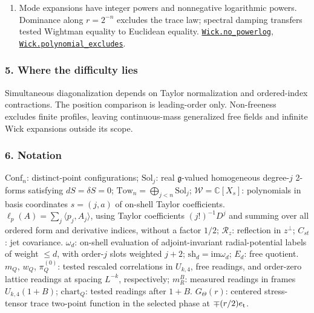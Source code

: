 \documentclass[
  letterpaper,
  11pt]{article}
\begin{document}
\begin{enumerate}
  \href{https://github.com/yang-mills-group/OpenAI-YM-20261028/blob/3456e5e75cf8d4cd558955a5c7638fba2d68f464/YM/Pert/Lattice/Blank.lean\#L41}{\texttt{Full.column}}.
\item
  Mode expansions have integer powers and nonnegative logarithmic
  powers. Dominance along \(r=2^{-n}\) excludes the trace law; spectral
  damping transfers tested Wightman equality to Euclidean equality.
  \href{https://github.com/yang-mills-group/OpenAI-YM-20261028/blob/3456e5e75cf8d4cd558955a5c7638fba2d68f464/YM/TraceExtension/Wick/Log.lean\#L96-L108}{\texttt{Wick.no\_powerlog}},
  \href{https://github.com/yang-mills-group/OpenAI-YM-20261028/blob/3456e5e75cf8d4cd558955a5c7638fba2d68f464/YM/TraceExtension/Wick/Refute.lean\#L86-L105}{\texttt{Wick.polynomial\_excludes}}.
\end{enumerate}

\subsubsection{5. Where the difficulty
lies}\label{where-the-difficulty-lies-27}

Simultaneous diagonalization depends on Taylor normalization and
ordered-index contractions. The position comparison is leading-order
only. Non-freeness excludes finite profiles, leaving continuous-mass
generalized free fields and infinite Wick expansions outside its scope.

\subsubsection{6. Notation}\label{notation-27}

\(\mathrm{Conf}_n\): distinct-point configurations; \(\mathrm{Sol}_j\):
real \(\mathfrak g\)-valued homogeneous degree-\(j\) 2-forms satisfying
\(dS=\delta S=0\); \(\mathrm{Tow}_n=\bigoplus_{j<n}\mathrm{Sol}_j\);
\(\mathcal W=\mathbb C[X_s]\): polynomials in basis coordinates
\(s=(j,a)\) of on-shell Taylor coefficients.
\(\ell_p(A)=\sum_j\langle p_j,A_j\rangle\), using Taylor coefficients
\((j!)^{-1}D^j\) and summing over all ordered form and derivative
indices, without a factor \(1/2\); \(\mathcal R_z\): reflection in
\(z^\perp\); \(C_{st}\): jet covariance. \(\omega_d\): on-shell
evaluation of adjoint-invariant radial-potential labels of weight
\(\le d\), with order-\(j\) slots weighted \(j+2\);
\(\mathrm{sh}_d=\mathrm{im}\omega_d\); \(E_d\): free quotient. \(m_Q\),
\(w_Q\), \(\pi_Q^{(0)}\): tested rescaled correlations in \(U_{k,4}\),
free readings, and order-zero lattice readings at spacing \(L^{-k}\),
respectively; \(m_R^B\): measured readings in frames \(U_{k,4}(1+B)\);
\(\mathrm{chart}_Q\): tested readings after \(1+B\). \(G_\Theta(r)\):
centered stress-tensor trace two-point function in the selected phase at
\(\mp(r/2)e_{\rm t}\).
\end{document}
